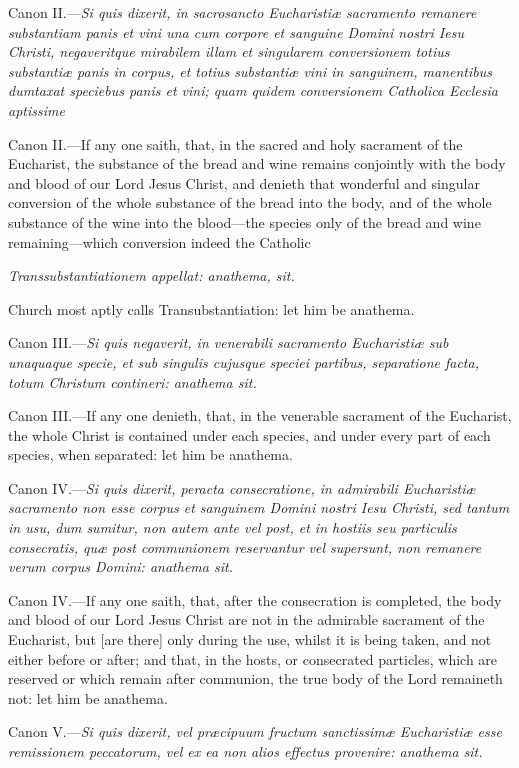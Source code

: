 Canon II.—\emph{Si quis dixerit, in sacrosancto Eucharistiæ sacramento remanere substantiam panis et vini una cum corpore et sanguine Domini nostri Iesu Christi, negaveritque mirabilem illam et singularem conversionem totius substantiæ panis in corpus, et totius substantiæ vini in sanguinem, manentibus dumtaxat speciebus panis et vini; quam quidem conversionem Catholica Ecclesia aptissime }

Canon II.—If any one saith, that, in the sacred and holy sacrament of the Eucharist, the substance of the bread and wine remains conjointly with the body and blood of our Lord Jesus Christ, and denieth that wonderful and singular conversion of the whole substance of the bread into the body, and of the whole substance of the wine into the blood—the species only of the bread and wine remaining—which conversion indeed the Catholic

\emph{Transsubstantiationem appellat: anathema, sit.}

Church most aptly calls Transubstantiation: let him be anathema.

Canon III.—\emph{Si quis negaverit, in venerabili sacramento Eucharistiæ sub unaquaque specie, et sub singulis cujusque speciei partibus, separatione facta, totum Christum contineri: anathema sit.}

Canon III.—If any one denieth, that, in the venerable sacrament of the Eucharist, the whole Christ is contained under each species, and under every part of each species, when separated: let him be anathema.

Canon IV.—\emph{Si quis dixerit, peracta consecratione, in admirabili Eucharistiæ sacramento non esse corpus et sanguinem Domini nostri Iesu Christi, sed tantum in usu, dum sumitur, non autem ante vel post, et in hostiis seu particulis consecratis, quæ post communionem reservantur vel supersunt, non remanere verum corpus Domini: anathema sit.}

Canon IV.—If any one saith, that, after the consecration is completed, the body and blood of our Lord Jesus Christ are not in the admirable sacrament of the Eucharist, but [are there] only during the use, whilst it is being taken, and not either before or after; and that, in the hosts, or consecrated particles, which are reserved or which remain after communion, the true body of the Lord remaineth not: let him be anathema.

Canon V.—\emph{Si quis dixerit, vel præcipuum fructum sanctissimæ Eucharistiæ esse remissionem peccatorum, vel ex ea non alios effectus provenire: anathema sit.}

